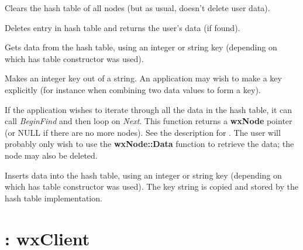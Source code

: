 

Clears the hash table of all nodes (but as usual, doesn't delete user data).




Deletes entry in hash table and returns the user's data (if found).




Gets data from the hash table, using an integer or string key (depending on which
has table constructor was used).



Makes an integer key out of a string. An application may wish to make a key
explicitly (for instance when combining two data values to form a key).



If the application wishes to iterate through all the data in the hash
table, it can call {\it BeginFind} and then loop on {\it Next}. This function
returns a {\bf wxNode} pointer (or NULL if there are no more nodes).  See the
description for . The user will probably only wish to use the
{\bf wxNode::Data} function to retrieve the data; the node may also be deleted.




Inserts data into the hash table, using an integer or string key (depending on which
has table constructor was used). The key string is copied and stored by the hash
table implementation.

\section{: wxClient}\label{wxhelpinstance}

